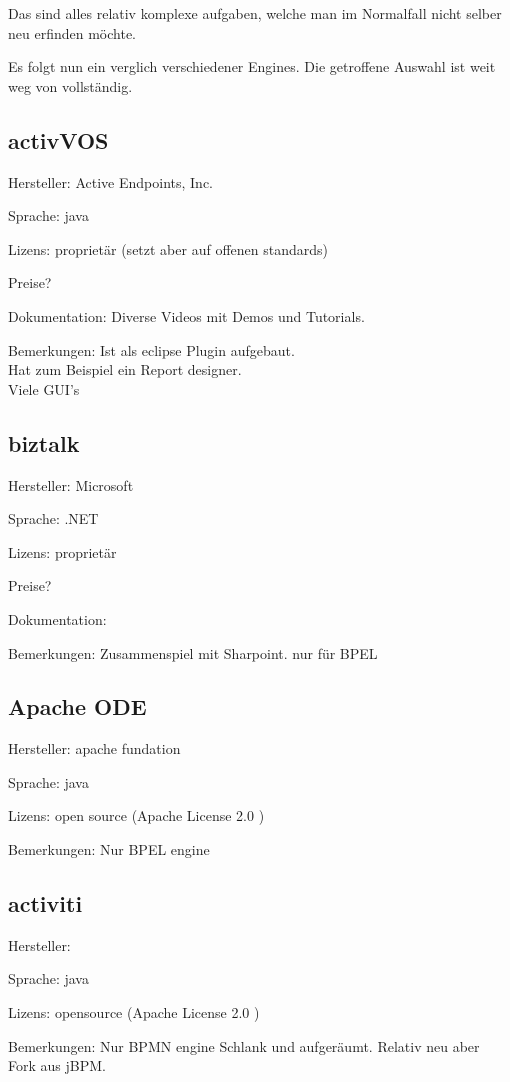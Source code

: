 \documentclass[paper=a4,twoside=false,BCOR=0mm,DIV=calc,fontsize=12pt]{scrartcl}
\begin{document}
Das sind alles relativ komplexe aufgaben, welche man im Normalfall nicht selber neu erfinden möchte.

Es folgt nun ein verglich verschiedener Engines. Die getroffene Auswahl ist weit weg von vollständig.



\subsection{activVOS}
Hersteller: Active Endpoints, Inc.

Sprache: java

Lizens: proprietär (setzt aber auf offenen standards)


Preise?

Dokumentation: Diverse Videos mit Demos und Tutorials.

Bemerkungen: Ist als eclipse Plugin aufgebaut. \\
Hat zum Beispiel ein Report designer. \\
Viele GUI's


\subsection{biztalk}
Hersteller: Microsoft

Sprache: .NET

Lizens: proprietär


Preise?

Dokumentation:

Bemerkungen:
Zusammenspiel mit Sharpoint.
nur für BPEL


\subsection{Apache ODE}
Hersteller: apache fundation

Sprache: java

Lizens: open source (Apache License 2.0 )

Bemerkungen:
Nur BPEL engine



\subsection{activiti}
Hersteller:

Sprache: java

Lizens: opensource (Apache License 2.0 )


Bemerkungen:
Nur BPMN engine
Schlank und aufgeräumt. 
Relativ neu aber Fork aus jBPM.
\end{document}
